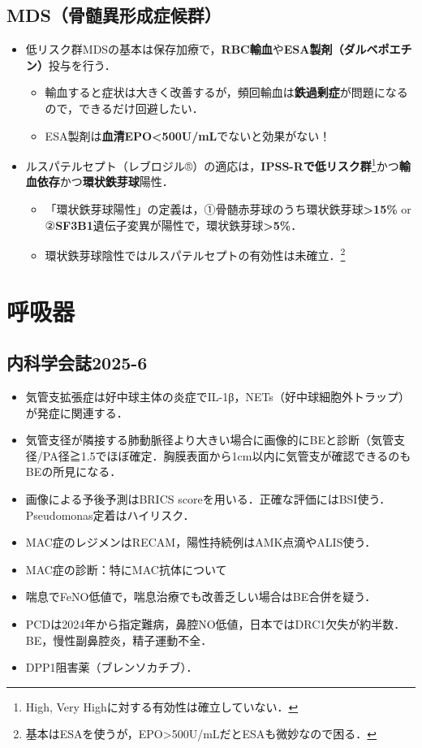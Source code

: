 \subsection{MDS（骨髄異形成症候群）}
\begin{itemize}

\item 低リスク群MDSの基本は保存加療で，\textbf{RBC輸血}や\textbf{ESA製剤（ダルベポエチン）}投与を行う．
\begin{itemize}
\item 輸血すると症状は大きく改善するが，頻回輸血は\textbf{鉄過剰症}が問題になるので，できるだけ回避したい．
\item ESA製剤は\textbf{血清EPO<500U/mL}でないと効果がない！
\end{itemize}
\item ルスパテルセプト（レブロジル®）の適応は，\textbf{IPSS-Rで低リスク群}\footnote{High, Very Highに対する有効性は確立していない．}かつ\textbf{輸血依存}かつ\textbf{環状鉄芽球}陽性．

\begin{itemize}
\item 「環状鉄芽球陽性」の定義は，①骨髄赤芽球のうち環状鉄芽球\textbf{>15\%} or ②\textbf{SF3B1}遺伝子変異が陽性で，環状鉄芽球\textbf{>5\%}．
\item 環状鉄芽球陰性ではルスパテルセプトの有効性は未確立．\footnote{基本はESAを使うが，EPO>500U/mLだとESAも微妙なので困る．}

\end{itemize}

\end{itemize}

\section{呼吸器}

\subsection{内科学会誌2025-6}
\begin{itemize}
\item 気管支拡張症は好中球主体の炎症でIL-1β，NETs（好中球細胞外トラップ）が発症に関連する．
\item 気管支径が隣接する肺動脈径より大きい場合に画像的にBEと診断（気管支径/PA径≧1.5でほぼ確定．胸膜表面から1cm以内に気管支が確認できるのもBEの所見になる．
\item 画像による予後予測はBRICS scoreを用いる．正確な評価にはBSI使う．Pseudomonas定着はハイリスク．
\item MAC症のレジメンはRECAM，陽性持続例はAMK点滴やALIS使う．
\item MAC症の診断：特にMAC抗体について
\item 喘息でFeNO低値で，喘息治療でも改善乏しい場合はBE合併を疑う．
\item PCDは2024年から指定難病，鼻腔NO低値，日本ではDRC1欠失が約半数．BE，慢性副鼻腔炎，精子運動不全．
\item DPP1阻害薬（ブレンソカチブ）．
\end{itemize}


